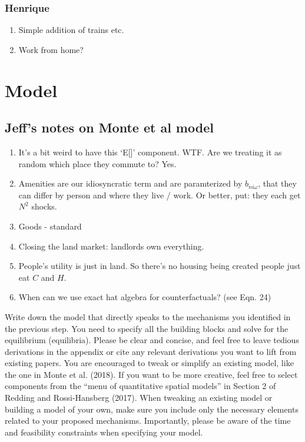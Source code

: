 \documentclass{article}
\begin{document}
\subsubsection{Henrique}
\begin{enumerate}
\item Simple addition of trains etc.
\item Work from home? 
\end{enumerate}

\section{Model}

\subsection{Jeff's notes on Monte et al model}
\begin{enumerate}
\item It's a bit weird to have this `E[]' component. WTF. Are we treating it as random which place they commute to? Yes.
\item Amenities are our idiosyncratic term and are paramterized by $b_{ni\omega}$, that they can differ by person and where they live / work. Or better, put: they each get $N^2$ shocks.
\item Goods - standard
\item Closing the land market: landlords own everything.
\item People's utility is just in land. So there's no housing being created people just eat $C$ and $H$.
\item  When can we use exact hat algebra for counterfactuals? (see Eqn. 24)
\end{enumerate}

Write down the model that directly speaks to the mechanisms you identified
in the previous step. You need to specify all the building blocks and solve for the
equilibrium (equilibria). Please be clear and concise, and feel free to leave tedious
derivations in the appendix or cite any relevant derivations you want to lift from
existing papers.
You are encouraged to tweak or simplify an existing model, like the one in Monte et
al. (2018). If you want to be more creative, feel free to select components from the
“menu of quantitative spatial models” in Section 2 of Redding and Rossi-Hansberg
(2017). When tweaking an existing model or building a model of your own, make
sure you include only the necessary elements related to your proposed mechanisms.
Importantly, please be aware of the time and feasibility constraints when specifying
your model.
\end{document}
